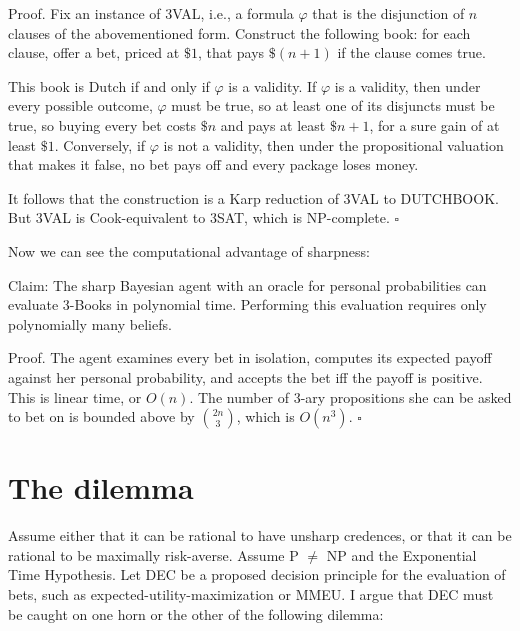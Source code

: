 \documentclass[letterpaper,12pt]{article}
\renewcommand{\phi}{\varphi}
\begin{document}
Proof. Fix an instance of 3VAL, i.e., a formula $\phi$ that is the disjunction of $n$ clauses of the abovementioned form. Construct the following book: for each clause, offer a bet, priced at $\$1$, that pays $\$(n+1)$ if the clause comes true.

This book is Dutch if and only if $\phi$ is a validity. If $\phi$ is a validity, then under every possible outcome, $\phi$ must be true, so at least one of its disjuncts must be true, so buying every bet costs $\$n$ and pays at least $\$n+1$, for a sure gain of at least $\$1$. Conversely, if $\phi$ is not a validity, then under the propositional valuation that makes it false, no bet pays off and every package loses money.

It follows that the construction is a Karp reduction of 3VAL to DUTCHBOOK. But 3VAL is Cook-equivalent to 3SAT, which is NP-complete. $\square$

Now we can see the computational advantage of sharpness:

Claim: The sharp Bayesian agent with an oracle for personal probabilities can evaluate 3-Books in polynomial time. Performing this evaluation requires only polynomially many beliefs.

Proof. The agent examines every bet in isolation, computes its expected payoff against her personal probability, and accepts the bet iff the payoff is positive. This is linear time, or $O(n)$. The number of 3-ary propositions she can be asked to bet on is bounded above by $\binom{2n}{3}$, which is $O(n^3)$. $\square$

\section{The dilemma}
Assume either that it can be rational to have unsharp credences, or that it can be rational to be maximally risk-averse. Assume P $\not =$ NP and the Exponential Time Hypothesis. Let DEC be a proposed decision principle for the evaluation of bets, such as expected-utility-maximization or MMEU. I argue that DEC must be caught on one horn or the other of the following dilemma:
\end{document}
